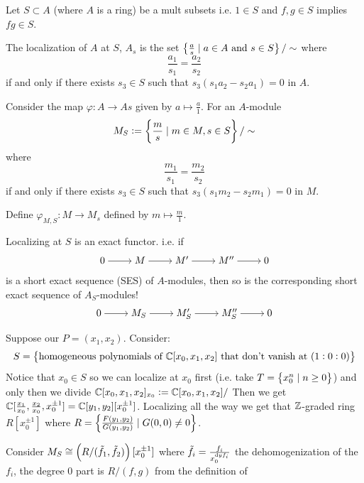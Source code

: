 \documentclass[11pt,a4paper]{article}
\begin{document}

Let $S \subset A$ (where $A$ is a ring) be a mult subsets i.e.
$1 \in S$ and $f,g \in S$ implies $fg \in S$.

The localization of $A$ at $S$, $A_s$
is the set $\left\{\frac{a}{s} \mid a \in A \text{ and } s \in S\right\} / \sim$
where
\[
  \frac{a_1}{s_1} = 
  \frac{a_2}{s_2}
\]
if and only if there exists $s_3 \in S$ such that $s_3(s_1 a_2 - s_2 a_1) = 0$
in $A$.


Consider the map $\varphi \colon A \to As$ given by $a \mapsto \frac{a}{1}$.
For an $A$-module
\[
  M_S := \left\{\frac{m}{s} \mid m \in M, s \in S\right\}/\sim
\]
where
\[
  \frac{m_1}{s_1} = 
  \frac{m_2}{s_2}
\]
if and only if there exists $s_3 \in S$ such that $s_3(s_1 m_2 - s_2 m_1) = 0$
in $M$.

Define $\varphi_{M,S} \colon M \to M_s$ defined by $m \mapsto \frac{m}{1}$.

\begin{remark}[Fact]
  Localizing at $S$ is an exact functor.
  i.e. if
\[\begin{tikzcd}[ampersand replacement=\&,cramped]
	0 \& M \& {M'} \& {M''} \& 0
	\arrow[from=1-1, to=1-2]
	\arrow[from=1-2, to=1-3]
	\arrow[from=1-3, to=1-4]
	\arrow[from=1-4, to=1-5]
\end{tikzcd}\]
is a short exact sequence (SES) of $A$-modules,
then so is the corresponding short exact sequence of $A_S$-modules!
\[\begin{tikzcd}[ampersand replacement=\&,cramped]
	0 \& M_S \& {M_S'} \& {M_S''} \& 0
	\arrow[from=1-1, to=1-2]
	\arrow[from=1-2, to=1-3]
	\arrow[from=1-3, to=1-4]
	\arrow[from=1-4, to=1-5]
\end{tikzcd}\]
\end{remark}

\begin{remark}
  Suppose our $P = (x_1,x_2)$.
  Consider:
  \[
    S = \left\{\text{homogeneous polynomials of $\mathbb{C}[x_0,x_1,x_2]$ that don't vanish at $(1:0:0)$}\right\}
  \]
  Notice that $x_0 \in S$ so we can localize at $x_0$ first
  (i.e. take $T = \left\{x_0^n \mid n \geq 0\right\}$)
  and only then we divide $\mathbb{C}[x_0,x_1,x_2]_{x_0} := \mathbb{C}[x_0,x_1,x_2]/$ %
  Then we get $\mathbb{C}[\frac{x_1}{x_0},\frac{x_2}{x_0},x_0^{\pm 1}] = \mathbb{C}[y_1,y_2][x_0^{\pm 1}]$.
  Localizing all the way we get that $\mathbb{Z}$-graded ring $R[x_0^{\pm 1}]$
  where $R = \left\{\frac{F(y_1,y_2)}{G(y_1,y_2)} \mid G(0,0) \neq 0\right\}$.

  Consider $M_S \cong \del{R/(\tilde f_1, \tilde f_2)}[x_0^{\pm 1}]$
  where $\tilde f_i = \frac{f_i}{x_0^{\dy f_i}}$ the dehomogenization of the $f_i$,
  the degree $0$ part is $R/(f,g)$ from the definition of
\end{remark}
\end{document}

